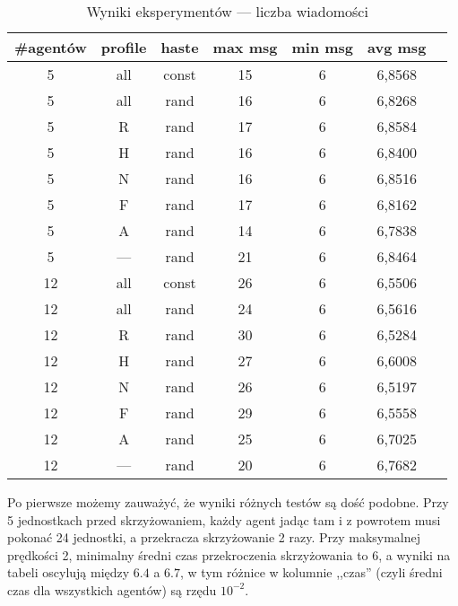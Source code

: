 \documentclass[11pt]{article}
\begin{document}
\begin{table}[h]
  \begin{center}
    \begin{tabular}{|c|c|c||c|c|c|c|}
      \hline
      \#agentów & profile & haste  & max msg & min msg & avg msg \\
      \hline
      5 & all & const & 15 & 6 & 6,8568 \\
      \hline
      5 & all & rand & 16 & 6 & 6,8268 \\
      \hline
      5 & R & rand  & 17 & 6 & 6,8584 \\
      \hline
      5 & H & rand  & 16 & 6 & 6,8400 \\
      \hline
      5 & N & rand  & 16 & 6 & 6,8516 \\
      \hline
      5 & F & rand  & 17 & 6 & 6,8162 \\
      \hline
      5 & A & rand  & 14 & 6 & 6,7838 \\
      \hline
      5 & --- & rand  & 21 & 6 & 6,8464 \\
      \hline
      12 & all & const & 26 & 6 & 6,5506 \\
      \hline
      12 & all & rand & 24 & 6 & 6,5616 \\
      \hline
      12 & R & rand & 30 & 6 & 6,5284 \\
      \hline
      12 & H & rand & 27 & 6 & 6,6008 \\
      \hline
      12 & N & rand & 26 & 6 & 6,5197 \\
      \hline
      12 & F & rand  & 29 & 6 & 6,5558 \\
      \hline
      12 & A & rand  & 25 & 6 & 6,7025 \\
      \hline
      12 & --- & rand & 20 & 6 & 6,7682 \\
      \hline
    \end{tabular}
    \caption{Wyniki eksperymentów --- liczba wiadomości}\label{messages}
  \end{center}
\end{table}


Po pierwsze możemy zauważyć, że wyniki różnych testów są dość podobne. Przy 5 jednostkach przed skrzyżowaniem, każdy agent jadąc tam i z powrotem musi pokonać 24 jednostki, a przekracza skrzyżowanie 2 razy. Przy maksymalnej prędkości 2, minimalny średni czas przekroczenia skrzyżowania to 6, a wyniki na tabeli oscylują między $6.4$ a $6.7$, w tym różnice w kolumnie ,,czas'' (czyli średni czas dla wszystkich agentów) są rzędu $10^{-2}$.
\end{document}
